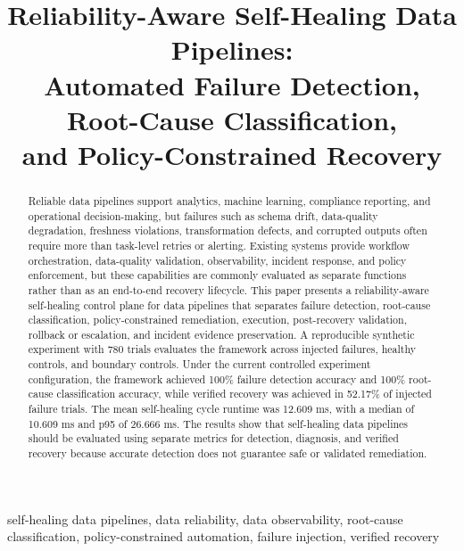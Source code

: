 \documentclass[conference]{IEEEtran}
\begin{document}
\title{Reliability-Aware Self-Healing Data Pipelines:\\
Automated Failure Detection,\\
Root-Cause Classification,\\
and Policy-Constrained Recovery}

\author{
}

\maketitle

\begin{abstract}
Reliable data pipelines support analytics, machine learning, compliance reporting, and operational decision-making, but failures such as schema drift, data-quality degradation, freshness violations, transformation defects, and corrupted outputs often require more than task-level retries or alerting. Existing systems provide workflow orchestration, data-quality validation, observability, incident response, and policy enforcement, but these capabilities are commonly evaluated as separate functions rather than as an end-to-end recovery lifecycle. This paper presents a reliability-aware self-healing control plane for data pipelines that separates failure detection, root-cause classification, policy-constrained remediation, execution, post-recovery validation, rollback or escalation, and incident evidence preservation. A reproducible synthetic experiment with 780 trials evaluates the framework across injected failures, healthy controls, and boundary controls. Under the current controlled experiment configuration, the framework achieved 100\% failure detection accuracy and 100\% root-cause classification accuracy, while verified recovery was achieved in 52.17\% of injected failure trials. The mean self-healing cycle runtime was 12.609 ms, with a median of 10.609 ms and p95 of 26.666 ms. The results show that self-healing data pipelines should be evaluated using separate metrics for detection, diagnosis, and verified recovery because accurate detection does not guarantee safe or validated remediation.
\end{abstract}

\begin{IEEEkeywords}
self-healing data pipelines, data reliability, data observability, root-cause classification, policy-constrained automation, failure injection, verified recovery
\end{IEEEkeywords}
\end{document}
